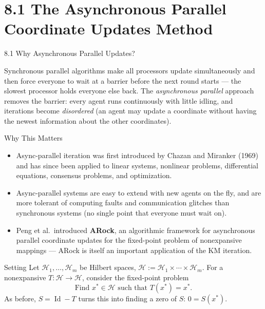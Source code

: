 \documentclass[aspectratio=169,10pt]{beamer}
\newcommand{\Hsp}{\mathcal H}
\newcommand{\Id}{\operatorname{Id}}
\begin{document}
\section{8.1 The Asynchronous Parallel Coordinate Updates Method}

\begin{frame}[allowframebreaks]{8.1 Why Asynchronous Parallel Updates?}

Synchronous parallel algorithms make all processors update simultaneously and then force everyone to wait at a barrier before the next round starts --- the slowest processor holds everyone else back. The \emph{asynchronous parallel} approach removes the barrier: every agent runs continuously with little idling, and iterations become \emph{disordered} (an agent may update a coordinate without having the newest information about the other coordinates).

\begin{block}{Why This Matters}
\begin{itemize}
  \item Async-parallel iteration was first introduced by Chazan and Miranker (1969) and has since been applied to linear systems, nonlinear problems, differential equations, consensus problems, and optimization.
  \item Async-parallel systems are easy to extend with new agents on the fly, and are more tolerant of computing faults and communication glitches than synchronous systems (no single point that everyone must wait on).
  \item Peng et al.\ introduced \textbf{ARock}, an algorithmic framework for asynchronous parallel coordinate updates for the fixed-point problem of nonexpansive mappings --- ARock is itself an important application of the KM iteration.
\end{itemize}
\end{block}

\begin{block}{Setting}
Let $\Hsp_1,\ldots,\Hsp_m$ be Hilbert spaces, $\Hsp:=\Hsp_1\times\cdots\times\Hsp_m$. For a nonexpansive $T:\Hsp\to\Hsp$, consider the fixed-point problem
\[
  \text{Find } x^*\in\Hsp \text{ such that } T(x^*)=x^*. \tag{8.1}
\]
As before, $S=\Id-T$ turns this into finding a zero of $S$: $0=S(x^*)$.
\end{block}

\framebreak


\end{frame}
\end{document}
